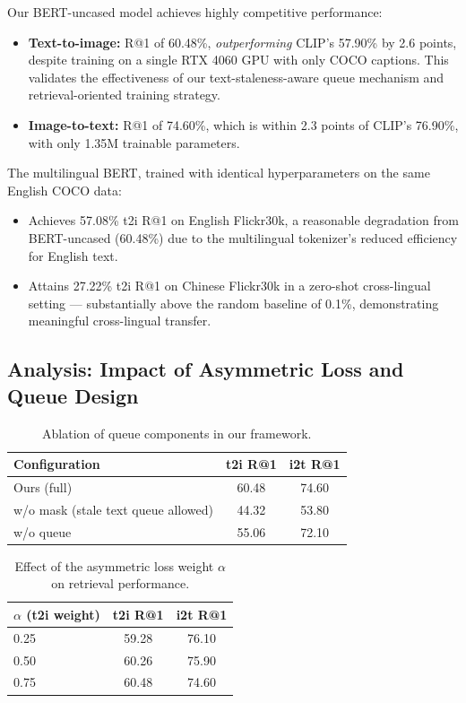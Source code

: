 \documentclass[10pt,leqno]{amsart}
\begin{document}
Our BERT-uncased model achieves highly competitive performance:
\begin{itemize}
    \item \textbf{Text-to-image:} R@1 of 60.48\%, \emph{outperforming} CLIP's 57.90\% by 2.6 points, despite training on a single RTX 4060 GPU with only COCO captions. This validates the effectiveness of our text-staleness-aware queue mechanism and retrieval-oriented training strategy.
    \item \textbf{Image-to-text:} R@1 of 74.60\%, which is within 2.3 points of CLIP's 76.90\%, with only 1.35M trainable parameters.
\end{itemize}

The multilingual BERT, trained with identical hyperparameters on the same English COCO data:
\begin{itemize}
    \item Achieves 57.08\% t2i R@1 on English Flickr30k, a reasonable degradation from BERT-uncased (60.48\%) due to the multilingual tokenizer's reduced efficiency for English text.
    \item Attains 27.22\% t2i R@1 on Chinese Flickr30k in a zero-shot cross-lingual setting --- substantially above the random baseline of 0.1\%, demonstrating meaningful cross-lingual transfer.
\end{itemize}

\subsection{Analysis: Impact of Asymmetric Loss and Queue Design}

\begin{table}[h]
\centering
\begin{tabular}{lcc}
\toprule
Configuration & t2i R@1 & i2t R@1 \\
\midrule
Ours (full) & 60.48 & 74.60 \\
w/o mask (stale text queue allowed) & 44.32 & 53.80 \\
w/o queue & 55.06 & 72.10 \\
\bottomrule
\end{tabular}
\caption{Ablation of queue components in our framework.}
\label{tab:ablation}
\end{table}

\begin{table}[h]
\centering
\begin{tabular}{lcc}
\toprule
$\alpha$ (t2i weight) & t2i R@1 & i2t R@1 \\
\midrule
0.25 & 59.28 & 76.10 \\
0.50 & 60.26 & 75.90 \\
0.75 & 60.48 & 74.60 \\
\bottomrule
\end{tabular}
\caption{Effect of the asymmetric loss weight $\alpha$ on retrieval performance.}
\label{tab:alpha}
\end{table}
\end{document}
